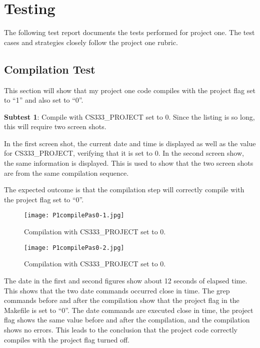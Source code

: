 \documentclass[11pt,letterpaper]{report}
\begin{document}
	
\ifdefined \LF
{\Large     %
\fi


  \section*{Testing}
  \noindent
  The following test report documents the tests performed for project one. The test cases and strategies closely follow the project one rubric. 

  \subsection*{Compilation Test}
  This section will show that my project one code compiles with the project flag set to ``1'' and also set to ``0''. 
  
  {\bf Subtest 1}: Compile with  CS333\_PROJECT set to 0. Since the listing is so long, this will require two screen shots.
  
  In the first screen shot, the current date and time is displayed as well as the value for CS333\_PROJECT, verifying that it is set to 0. In the second screen show, the same information is displayed. This is used to show that the two screen shots are from the same compilation sequence.
  
  The expected outcome is that the compilation step will correctly compile with the project flag set to ``0''.
  
  \begin{figure}[h!]
	\centering
	\texttt{[image: P1compilePas0-1.jpg]}
	\caption[Part 1: Project flag set to 0]{Compilation with CS333\_PROJECT set to 0.}
	\label{fig:P1compileP0-1}
  \end{figure}

  \begin{figure}[h!]
	\centering
	\texttt{[image: P1compilePas0-2.jpg]}
	\caption[Part 2: Project flag set to 0]{Compilation with CS333\_PROJECT set to 0.}
	\label{fig:P1compileP0-2}
  \end{figure}

  The date in the first and second figures show about 12 seconds of elapsed time. This shows that the two date commands occurred close in time. The grep commands before and after the compilation show that the project flag in the Makefile is set to ``0''. The date commands are executed close in time, the project flag shows the same value before and after the compilation, and the compilation shows no errors. This leads to the conclusion that the project code correctly compiles with the project flag turned off.
  
}
\end{document}
